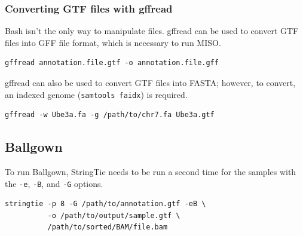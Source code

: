 \subsubsection*{Converting GTF files with gffread}
Bash isn't the only way to manipulate files. gffread can be used to convert GTF files into GFF file format, which is necessary to run MISO.
\begin{verbatim}
gffread annotation.file.gtf -o annotation.file.gff
\end{verbatim}

gffread can also be used to convert GTF files into FASTA; however, to convert, an indexed genome (\texttt{samtools faidx}) is required.
\begin{verbatim}
gffread -w Ube3a.fa -g /path/to/chr7.fa Ube3a.gtf
\end{verbatim}




\subsection{Ballgown}
To run Ballgown, StringTie needs to be run a second time for the samples with the \texttt{-e}, \texttt{-B}, and \texttt{-G} options.
\begin{verbatim}
stringtie -p 8 -G /path/to/annotation.gtf -eB \
          -o /path/to/output/sample.gtf \
          /path/to/sorted/BAM/file.bam
\end{verbatim}

